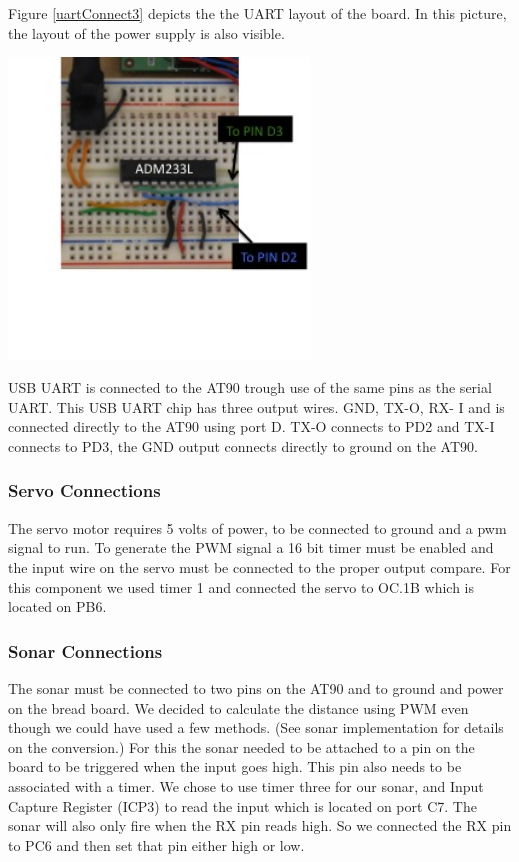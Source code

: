 Figure \ref{uartConnect3} depicts the the UART layout of the board. In this picture, the layout of the power supply is also visible. 

\begin{minipage}{6in}
  \centering
   \includegraphics[width=0.6\textwidth]{imageSources/uartConnect3.png}
  
  \label{uartConnect3}
\end{minipage}
\vspace{0.1in}


USB UART is connected to the AT90 trough use of the same pins as the serial UART.  This USB UART chip has three output wires.  GND, TX-O, RX- I and is connected directly to the AT90 using port D. TX-O connects to PD2 and TX-I connects to PD3, the GND output connects directly to ground on the AT90.

\subsubsection{Servo Connections}
The servo motor requires 5 volts of power, to be connected to ground and a pwm signal to run. To generate the PWM signal a 16 bit timer must be enabled and the input wire on the servo must be connected to the proper output compare. For this component we used timer 1 and connected the servo to OC.1B which is located on PB6.

\subsubsection{Sonar Connections}
The sonar must be connected to two pins on the AT90 and to ground and power on the bread board. We decided to calculate the distance using PWM even though we could have used a few methods. (See sonar implementation for details on the conversion.)  For this the sonar needed to be attached to a pin on the board to be triggered when the input goes high. This pin also needs to be associated with a timer. We chose to use timer three for our sonar, and Input Capture Register (ICP3) to read the input which is located on port C7. The sonar will also only fire when the RX pin reads high. So we connected the RX pin to PC6 and then set that pin either high or low.

